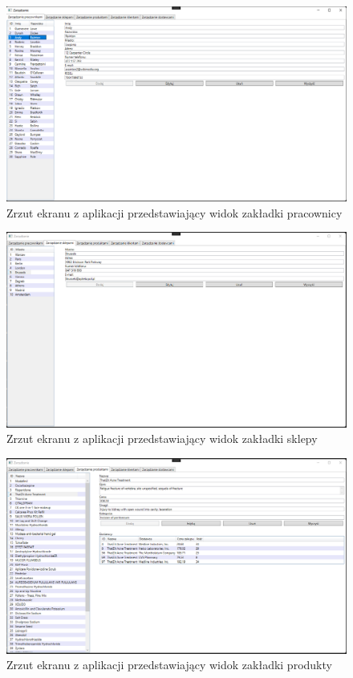 \documentclass[12pt,a4paper]{article}
\begin{document}
        \begin{figure}[H]
            \centering
            \includegraphics[scale=0.4]{images/pracownicy.png}
            \caption{Zrzut ekranu z aplikacji przedstawiający widok zakładki pracownicy}
        \end{figure}
            
        \begin{figure}[H]
            \centering
            \includegraphics[scale=0.4]{images/sklepy.png}
            \caption{Zrzut ekranu z aplikacji przedstawiający widok zakładki sklepy}
        \end{figure}
            
        \begin{figure}[H]
            \centering
            \includegraphics[scale=0.4]{images/produkty.png}
            \caption{Zrzut ekranu z aplikacji przedstawiający widok zakładki produkty}
        \end{figure}
            
\end{document}
